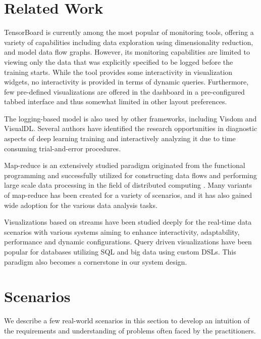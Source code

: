 \documentclass[sigchi]{acmart} %
\begin{document}
\section{Related Work}
TensorBoard\cite{Wongsuphasawat2018} is currently among the most popular of monitoring tools, offering a variety of capabilities including data exploration using dimensionality reduction, and model data flow graphs. However, its monitoring capabilities are limited to viewing only the data that was explicitly specified to be logged before the training starts. While the tool provides some interactivity in visualization widgets, no  interactivity is provided in terms of dynamic queries. Furthermore, few pre-defined visualizations are offered in the dashboard in a pre-configured tabbed interface and thus somewhat limited in other layout preferences. 

The logging-based model is also used by other frameworks, including Visdom\cite{Choo2018} and VisualDL\cite{VisualDL}. Several authors\cite{Liu2017,DBLP:journals/corr/abs-1712-05902,Choo2018} have identified the research opportunities in diagnostic aspects of deep learning training and interactively analyzing it due to time consuming trial-and-error procedures.

Map-reduce is an extensively studied paradigm originated from the functional programming \cite{Steele1995} and successfully utilized for constructing data flows and performing large scale data processing in the field of distributed computing \cite{Dean2008,Gates:2009:BHD:1687553.1687568,Catanzaro2008AMR}. Many variants of map-reduce has been created\cite{Afrati:2011:MER:1951365.1951367} for a variety of scenarios, and it has also gained wide adoption for the various data analysis tasks\cite{Ekanayake2008,Pavlo:2009:CAL:1559845.1559865}.

Visualizations based on streams have been studied deeply for the real-time data scenarios\cite{(Ed.)98datavisualization,Traub2017} with various systems aiming to enhance interactivity, adaptability, performance and dynamic configurations\cite{Logre:2018:MSV:3233739.3229096,ellis2014real, Roberts2007, Few:2006:IDD:1206491}. Query driven visualizations have been popular for databases utilizing SQL and big data using custom DSLs\cite{Stockinger, Babu:2001:CQO:603867.603884, Plale2003}. This paradigm also becomes a cornerstone in our system design.


\section{Scenarios}
We describe a few real-world scenarios in this section to develop an intuition of the requirements and understanding of problems often faced by the practitioners.
\end{document}
